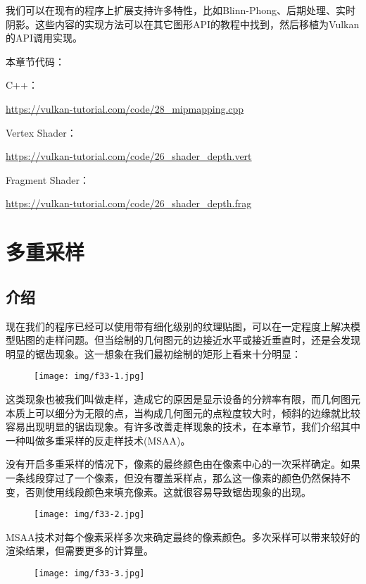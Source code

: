 \documentclass{ctexart}
\begin{document}
我们可以在现有的程序上扩展支持许多特性，比如Blinn-Phong、后期处理、实时阴影。这些内容的实现方法可以在其它图形API的教程中找到，然后移植为Vulkan的API调用实现。

本章节代码：

C++：

\url{https://vulkan-tutorial.com/code/28_mipmapping.cpp}

Vertex Shader：

\url{https://vulkan-tutorial.com/code/26_shader_depth.vert}

Fragment Shader：

\url{https://vulkan-tutorial.com/code/26_shader_depth.frag}

\newpage
\section{多重采样}

\subsection{介绍}

现在我们的程序已经可以使用带有细化级别的纹理贴图，可以在一定程度上解决模型贴图的走样问题。但当绘制的几何图元的边接近水平或接近垂直时，还是会发现明显的锯齿现象。这一想象在我们最初绘制的矩形上看来十分明显：

\begin{figure}[H]
	\centering
	\texttt{[image: img/f33-1.jpg]}
\end{figure}

这类现象也被我们叫做走样，造成它的原因是显示设备的分辨率有限，而几何图元本质上可以细分为无限的点，当构成几何图元的点粒度较大时，倾斜的边缘就比较容易出现明显的锯齿现象。有许多改善走样现象的技术，在本章节，我们介绍其中一种叫做多重采样的反走样技术(MSAA)。

没有开启多重采样的情况下，像素的最终颜色由在像素中心的一次采样确定。如果一条线段穿过了一个像素，但没有覆盖采样点，那么这一像素的颜色仍然保持不变，否则使用线段颜色来填充像素。这就很容易导致锯齿现象的出现。

\begin{figure}[H]
	\centering
	\texttt{[image: img/f33-2.jpg]}
\end{figure}

MSAA技术对每个像素采样多次来确定最终的像素颜色。多次采样可以带来较好的渲染结果，但需要更多的计算量。

\begin{figure}[H]
	\centering
	\texttt{[image: img/f33-3.jpg]}
\end{figure}
\end{document}
